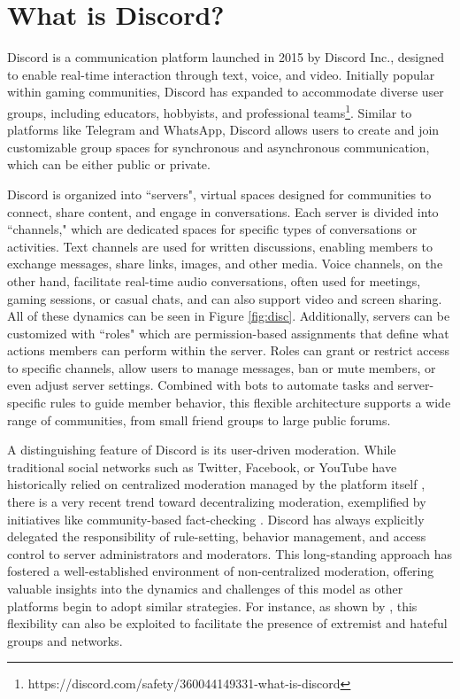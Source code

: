 
\section{What is Discord?}

Discord is a communication platform launched in 2015 by Discord Inc., designed to enable real-time interaction through text, voice, and video. Initially popular within gaming communities, Discord has expanded to accommodate diverse user groups, including educators, hobbyists, and professional teams\footnote{https://discord.com/safety/360044149331-what-is-discord}. Similar to platforms like Telegram and WhatsApp, Discord allows users to create and join customizable group spaces for synchronous and asynchronous communication, which can be either public or private.


Discord is organized into ``servers", virtual spaces designed for communities to connect, share content, and engage in conversations. Each server is divided into ``channels," which are dedicated spaces for specific types of conversations or activities. Text channels are used for written discussions, enabling members to exchange messages, share links, images, and other media. Voice channels, on the other hand, facilitate real-time audio conversations, often used for meetings, gaming sessions, or casual chats, and can also support video and screen sharing. All of these dynamics can be seen in Figure \ref{fig:disc}. Additionally, servers can be customized with ``roles" which are permission-based assignments that define what actions members can perform within the server. Roles can grant or restrict access to specific channels, allow users to manage messages, ban or mute members, or even adjust server settings. Combined with bots to automate tasks and server-specific rules to guide member behavior, this flexible architecture supports a wide range of communities, from small friend groups to large public forums.


A distinguishing feature of Discord is its user-driven moderation. While traditional social networks such as Twitter, Facebook, or YouTube have historically relied on centralized moderation managed by the platform itself \cite{wilson2020hate}, there is a very recent trend toward decentralizing moderation, exemplified by initiatives like community-based fact-checking \cite{balasubramanian2024publicdatasettrackingsocial}. Discord has always explicitly delegated the responsibility of rule-setting, behavior management, and access control to server administrators and moderators. This long-standing approach has fostered a well-established environment of non-centralized moderation, offering valuable insights into the dynamics and challenges of this model as other platforms begin to adopt similar strategies. For instance, as shown by \cite{moderation-challenges}, this flexibility can also be exploited to facilitate the presence of extremist and hateful groups and networks.

